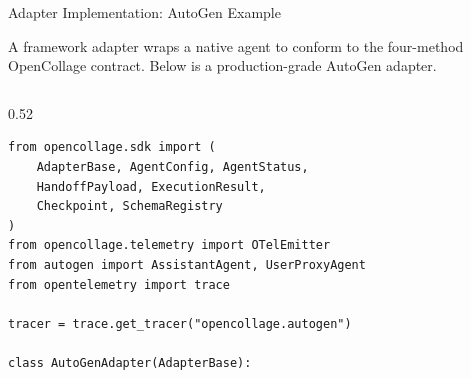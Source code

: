 \begin{frame}[fragile]{Adapter Implementation: AutoGen Example}
  \vspace{0.1cm}
  \fontsize{5.5}{6.5}\selectfont
  \begin{block}{}
    \fontsize{5.5}{6.5}\selectfont
    A framework adapter wraps a native agent to conform to the four-method
    OpenCollage contract. Below is a production-grade AutoGen adapter.
  \end{block}

  \vspace{-0.1cm}

  \begin{columns}[T]
    \begin{column}{0.52\textwidth}
      \begin{lstlisting}[style=pythonstyle,basicstyle=\ttfamily\fontsize{3.3}{4}\selectfont,title={\tiny\bfseries opencollage/adapters/autogen\_adapter.py}]
from opencollage.sdk import (
    AdapterBase, AgentConfig, AgentStatus,
    HandoffPayload, ExecutionResult,
    Checkpoint, SchemaRegistry
)
from opencollage.telemetry import OTelEmitter
from autogen import AssistantAgent, UserProxyAgent
from opentelemetry import trace

tracer = trace.get_tracer("opencollage.autogen")

class AutoGenAdapter(AdapterBase):


\end{lstlisting}
\end{column}
\end{columns}
\end{frame}
